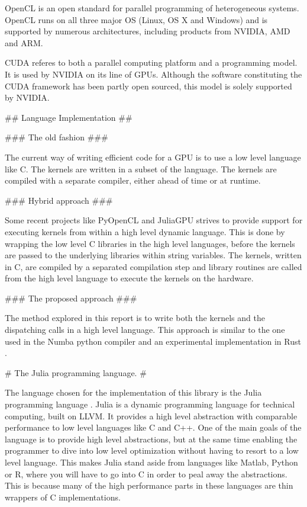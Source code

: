 \begin{markdown}
\gls{OpenCL} is an open standard for parallel programming of
heterogeneous systems. \gls{OpenCL} runs on all three major OS (Linux,
OS X and Windows) and is supported by numerous architectures, including
products from NVIDIA, \gls{AMD} and ARM.

\gls{CUDA} referes to both a parallel computing platform and a
programming model. It is used by NVIDIA on its line of GPUs. Although
the software constituting the \gls{CUDA} framework has been partly
open sourced, this model is solely supported by NVIDIA.

## Language Implementation ##

### The old fashion ###

The current way of writing efficient code for a \gls{GPU} is to use a
low level language like C. The kernels are written in a subset of the
language. The kernels are compiled with a separate compiler, either
ahead of time or at runtime.

### Hybrid approach ###

Some recent projects like PyOpenCL \cite{pyopencl} and JuliaGPU
\cite{JuliaGPU} strives to provide support for executing kernels from
within a high level dynamic language. This is done by wrapping the low
level C libraries in the high level languages, before the kernels are
passed to the underlying libraries within string variables. The
kernels, written in C, are compiled by a separated compilation step
and library routines are called from the high level language to
execute the kernels on the hardware.

### The proposed approach ###

The method explored in this report is to write both the kernels and
the dispatching calls in a high level language. This approach is
similar to the one used in the Numba python compiler \cite{numba} and
an experimental implementation in Rust \cite{rustgpu}.

# The Julia programming language. #

The language chosen for the implementation of this library is the
Julia programming language \cite{julia}. Julia is a dynamic
programming language for technical computing, built on \gls{LLVM}. It
provides a high level abstraction with comparable performance to low
level languages like C and C++. One of the main goals of the language
is to provide high level abstractions, but at the same time enabling
the programmer to dive into low level optimization without having to
resort to a low level language. This makes Julia stand aside from
languages like Matlab, Python or R, where you will have to go into C
in order to peal away the abstractions. This is because many of the
high performance parts in these languages are thin wrappers of C
implementations.


\end{markdown}
